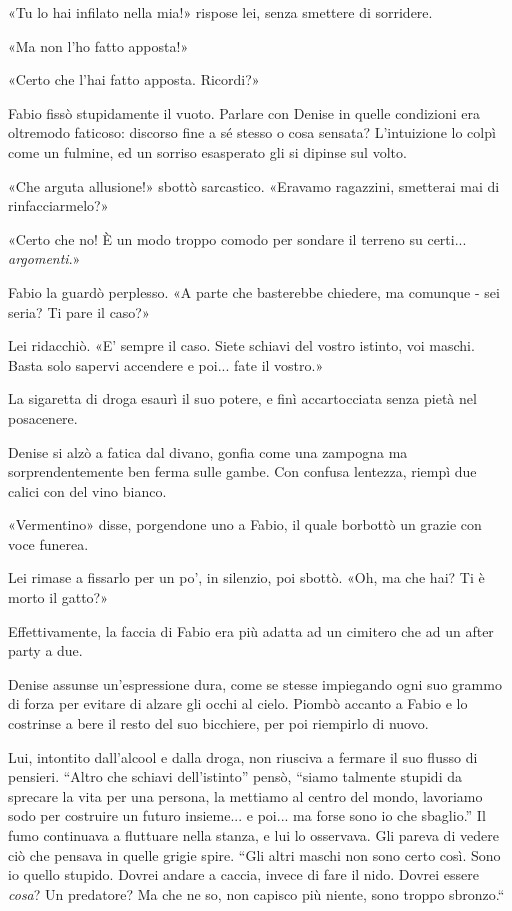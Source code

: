 «Tu lo hai infilato nella mia!» rispose lei, senza smettere di sorridere.

«Ma non l'ho fatto apposta!»

«Certo che l'hai fatto apposta. Ricordi?»

Fabio fissò stupidamente il vuoto. Parlare con Denise in quelle condizioni era oltremodo faticoso: discorso fine a sé stesso o cosa sensata? L'intuizione lo colpì come un fulmine, ed un sorriso esasperato gli si dipinse sul volto.

«Che arguta allusione!» sbottò sarcastico. «Eravamo ragazzini, smetterai mai di rinfacciarmelo?»

«Certo che no! È un modo troppo comodo per sondare il terreno su certi... \emph{argomenti}.»

Fabio la guardò perplesso. «A parte che basterebbe chiedere, ma comunque - sei seria? Ti pare il caso?»

Lei ridacchiò. «E' sempre il caso. Siete schiavi del vostro istinto, voi maschi. Basta solo sapervi accendere e poi... fate il vostro.»

La sigaretta di droga esaurì il suo potere, e finì accartocciata senza pietà nel posacenere.

Denise si alzò a fatica dal divano, gonfia come una zampogna ma sorprendentemente ben ferma sulle gambe. Con confusa lentezza, riempì due calici con del vino bianco.

«Vermentino» disse, porgendone uno a Fabio, il quale borbottò un grazie con voce funerea.

Lei rimase a fissarlo per un po', in silenzio, poi sbottò. «Oh, ma che hai? Ti è morto il gatto?»

Effettivamente, la faccia di Fabio era più adatta ad un cimitero che ad un after party a due.

Denise assunse un'espressione dura, come se stesse impiegando ogni suo grammo di forza per evitare di alzare gli occhi al cielo. Piombò accanto a Fabio e lo costrinse a bere il resto del suo bicchiere, per poi riempirlo di nuovo.

Lui, intontito dall'alcool e dalla droga, non riusciva a fermare il suo flusso di pensieri. ``Altro che schiavi dell'istinto'' pensò, ``siamo talmente stupidi da sprecare la vita per una persona, la mettiamo al centro del mondo, lavoriamo sodo per costruire un futuro insieme... e poi... ma forse sono io che sbaglio.'' Il fumo continuava a fluttuare nella stanza, e lui lo osservava. Gli pareva di vedere ciò che pensava in quelle grigie spire. ``Gli altri maschi non sono certo così. Sono io quello stupido. Dovrei andare a caccia, invece di fare il nido. Dovrei essere \emph{cosa}? Un predatore? Ma che ne so, non capisco più niente, sono troppo sbronzo.``


